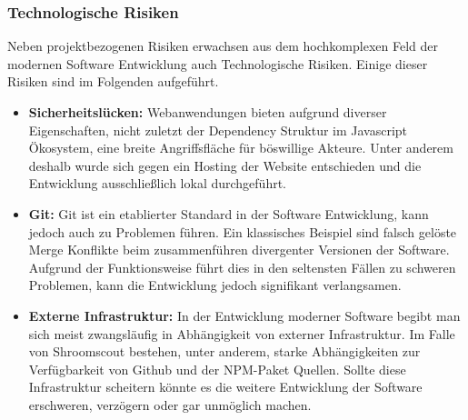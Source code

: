 \documentclass[../main.tex]{subfiles}
\begin{document}
\subsubsection{Technologische Risiken}

Neben projektbezogenen Risiken erwachsen aus dem hochkomplexen Feld der modernen Software Entwicklung auch Technologische Risiken. Einige dieser Risiken
sind im Folgenden aufgeführt.

\begin{itemize}

	\item \textbf{Sicherheitslücken:}
	      Webanwendungen bieten aufgrund diverser Eigenschaften, nicht zuletzt der Dependency Struktur im Javascript Ökosystem, eine breite Angriffsfläche
	      für böswillige Akteure. Unter anderem deshalb wurde sich gegen ein Hosting der Website entschieden und die Entwicklung ausschließlich lokal durchgeführt.

	\item \textbf{Git:}
	      Git ist ein etablierter Standard in der Software Entwicklung, kann jedoch auch zu Problemen führen. Ein klassisches Beispiel sind falsch gelöste Merge
	      Konflikte beim zusammenführen divergenter Versionen der Software. Aufgrund der Funktionsweise führt dies in den seltensten Fällen zu schweren Problemen,
	      kann die Entwicklung jedoch signifikant verlangsamen.

	\item \textbf{Externe Infrastruktur:}
	      In der Entwicklung moderner Software begibt man sich meist zwangsläufig in Abhängigkeit von externer Infrastruktur. Im Falle von Shroomscout bestehen,
	      unter anderem, starke Abhängigkeiten zur Verfügbarkeit von Github und der NPM-Paket Quellen. Sollte diese Infrastruktur scheitern könnte es die weitere
	      Entwicklung der Software erschweren, verzögern oder gar unmöglich machen.

\end{itemize}
\end{document}

